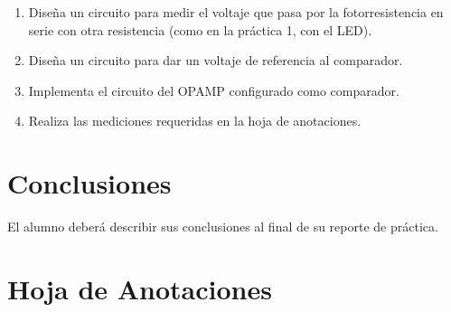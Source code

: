 	\begin{enumerate}
		\item Diseña un circuito para medir el voltaje que pasa por la fotorresistencia en serie con otra resistencia (como en la práctica 1, con el LED).
		\item Diseña un circuito para dar un voltaje de referencia al comparador.
		\item Implementa el circuito del OPAMP configurado como comparador.
		\item Realiza las mediciones requeridas en la hoja de anotaciones.
	\end{enumerate}



\section{Conclusiones}

	El alumno deberá describir sus conclusiones al final de su reporte de práctica.
    

\clearpage
\section{Hoja de Anotaciones}
	
